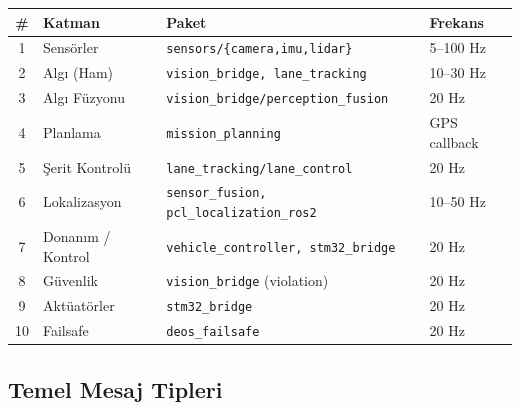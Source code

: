\documentclass[11pt,a4paper]{article}
\begin{document}
\begin{center}
\begin{tabular}{@{}clll@{}}
\toprule
\textbf{\#} & \textbf{Katman} & \textbf{Paket} & \textbf{Frekans} \\
\midrule
1 & Sensörler         & \texttt{sensors/\{camera,imu,lidar\}}            & 5–100 Hz \\
2 & Algı (Ham)        & \texttt{vision\_bridge, lane\_tracking}           & 10–30 Hz \\
3 & Algı Füzyonu      & \texttt{vision\_bridge/perception\_fusion}        & 20 Hz \\
4 & Planlama          & \texttt{mission\_planning}                        & GPS callback \\
5 & Şerit Kontrolü    & \texttt{lane\_tracking/lane\_control}             & 20 Hz \\
6 & Lokalizasyon      & \texttt{sensor\_fusion, pcl\_localization\_ros2}  & 10–50 Hz \\
7 & Donanım / Kontrol & \texttt{vehicle\_controller, stm32\_bridge}       & 20 Hz \\
8 & Güvenlik          & \texttt{vision\_bridge} (violation)               & 20 Hz \\
9 & Aktüatörler       & \texttt{stm32\_bridge}                            & 20 Hz \\
10 & Failsafe         & \texttt{deos\_failsafe}                           & 20 Hz \\
\bottomrule
\end{tabular}
\end{center}

\subsection{Temel Mesaj Tipleri}
\end{document}
